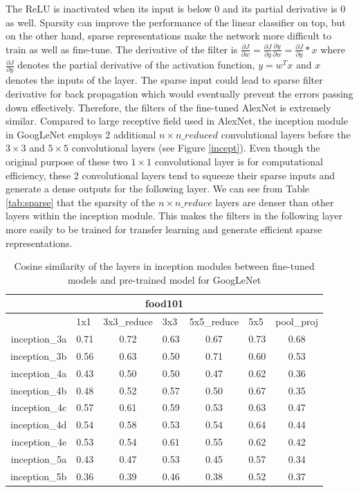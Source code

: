     The ReLU is inactivated when its input is below 0 and its partial derivative is 0 as well. Sparsity can improve the performance of the linear classifier on top, but on the other hand, sparse representations make the network more difficult to train as well as fine-tune. The derivative of the filter is $\frac{{\partial J}}{{\partial w}} = \frac{{\partial J}}{{\partial y}}\frac{{\partial y}}{{\partial w}} = \frac{{\partial J}}{{\partial y}}*x$ where $\frac{{\partial J}}{{\partial y}}$ denotes the partial derivative of the activation function, $y=w^Tx$ and $x$ denotes the inputs of the layer. The sparse input could lead to sparse filter derivative for back propagation which would eventually prevent the errors passing down effectively. Therefore, the filters of the fine-tuned AlexNet is extremely similar. Compared to large receptive field used in AlexNet, the inception module in GoogLeNet employs 2 additional $n\times n\_reduced$ convolutional layers before the $3\times 3$ and $5\times 5$ convolutional layers (see Figure \ref{incept}). Even though the original purpose of these two $1\times 1$ convolutional layer is for computational efficiency, these 2 convolutional layers tend to squeeze their sparse inputs and generate a dense outputs for the following layer. We can see from Table \ref{tab:sparse} that the sparsity of the $n\times n\_reduce$ layers are denser than other layers within the inception module. This makes the filters in the following layer more easily to be trained for transfer learning and generate efficient sparse representations.


\begin{table}[htbp]
  \centering
  \caption{Cosine similarity of the layers in inception modules between fine-tuned models and pre-trained model for GoogLeNet}
    \begin{tabular}{r|cccccc}
    \toprule
    \multicolumn{7}{c}{food101} \\ \midrule
          & \multicolumn{1}{l}{1x1 } & \multicolumn{1}{l}{3x3\_reduce} & \multicolumn{1}{l}{3x3} & \multicolumn{1}{l}{5x5\_reduce} & \multicolumn{1}{l}{5x5} & \multicolumn{1}{l}{pool\_proj } \\
    inception\_3a & 0.71  & 0.72  & 0.63  & 0.67  & 0.73  & 0.68 \\
    inception\_3b & 0.56  & 0.63  & 0.50  & 0.71  & 0.60  & 0.53 \\
    inception\_4a & 0.43  & 0.50  & 0.50  & 0.47  & 0.62  & 0.36 \\
    inception\_4b & 0.48  & 0.52  & 0.57  & 0.50  & 0.67  & 0.35 \\
    inception\_4c & 0.57  & 0.61  & 0.59  & 0.53  & 0.63  & 0.47 \\
    inception\_4d & 0.54  & 0.58  & 0.53  & 0.54  & 0.64  & 0.44 \\
    inception\_4e & 0.53  & 0.54  & 0.61  & 0.55  & 0.62  & 0.42 \\
    inception\_5a & 0.43  & 0.47  & 0.53  & 0.45  & 0.57  & 0.34 \\
    inception\_5b & 0.36  & 0.39  & 0.46  & 0.38  & 0.52  & 0.37 \\
    \bottomrule
    \end{tabular}%
  \label{tab:cosg}%
\end{table}%


